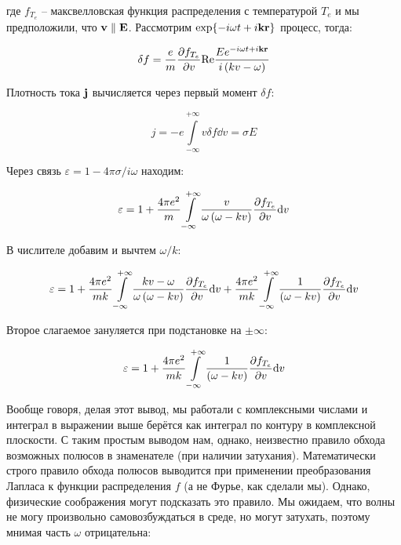 \documentclass[10pt, a4paper]{article}
\begin{document}
где $f_{T_e}$ -- максвелловская функция распределения с температурой $T_e$ и мы предположили, что $\vb{v} \parallel \vb{E}$. Рассмотрим $\exp{-i\omega t + i \vb{kr}}$ процесс, тогда:

\begin{equation*}
	\delta f = \frac{e}{m}\pdv{f_{T_e}}{v}\text{Re}\frac{Ee^{-i\omega t + i \vb{kr}}}{i\left( kv - \omega \right)}
\end{equation*}

Плотность тока $\vb{j}$ вычисляется через первый момент $\delta f$:

\begin{equation*}
	j = -e\int\limits_{-\infty}^{+\infty} v\delta f\dd v = \sigma E
\end{equation*}

Через связь $\varepsilon = 1 - 4\pi\sigma/i\omega$ находим:

\begin{equation*}
	\varepsilon = 1 + \frac{4\pi e^2}{m}\int\limits_{-\infty}^{+\infty}\frac{v }{\omega\left( \omega - kv \right)}\pdv{f_{T_e}}{v}\dd v
\end{equation*}

В числителе добавим и вычтем $\omega/k$:

\begin{equation*}
	\varepsilon = 1 + \frac{4\pi e^2}{mk}\int\limits_{-\infty}^{+\infty}\frac{kv - \omega }{\omega\left( \omega - kv \right)}\pdv{f_{T_e}}{v}\dd v + \frac{4\pi e^2}{mk}\int\limits_{-\infty}^{+\infty}\frac{1}{\left( \omega - kv \right)}\pdv{f_{T_e}}{v}\dd v
\end{equation*}

Второе слагаемое зануляется при подстановке на $\pm\infty$:

\begin{equation*}
	\varepsilon = 1 + \frac{4\pi e^2}{mk}\int\limits_{-\infty}^{+\infty}\frac{1}{\left( \omega - kv \right)}\pdv{f_{T_e}}{v}\dd v
\end{equation*}

Вообще говоря, делая этот вывод, мы работали с комплексными числами и интеграл в выражении выше берётся как интеграл по контуру в комплексной плоскости. С таким простым выводом нам, однако, неизвестно правило обхода возможных полюсов в знаменателе (при наличии затухания). Математически строго правило обхода полюсов выводится при применении преобразования Лапласа к функции распределения $f$ (а не Фурье, как сделали мы). Однако, физические соображения могут подсказать это правило. Мы ожидаем, что волны не могу произвольно самовозбуждаться в среде, но могут затухать, поэтому мнимая часть $\omega$ отрицательна:
\end{document}
